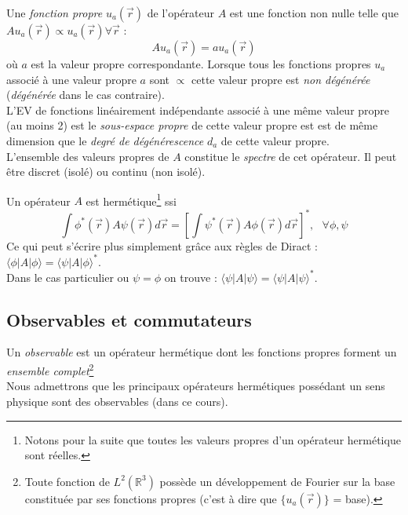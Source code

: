 \documentclass	[11pt, a4paper, openany]{book}
\begin{document}
Une \textit{fonction propre} $u_a(\vec{r})$ de l'opérateur $A$ est une fonction non nulle telle que $Au_a(\vec{r}) \propto u_a(\vec{r}) \forall \vec{r}$ :
\begin{equation}
Au_a(\vec{r}) = au_a(\vec{r})
\end{equation}
où $a$ est la valeur propre correspondante. Lorsque tous les fonctions propres $u_a$ associé à une valeur propre $a$ sont $\propto$ cette valeur propre est \textit{non dégénérée} (\textit{dégénérée} dans le cas contraire).\\
L'EV de fonctions linéairement indépendante associé à une même valeur propre (au moins 2) est le \textit{sous-espace propre} de cette valeur propre est est de même dimension que le \textit{degré de dégénérescence} $d_a$ de cette valeur propre.\\

L'ensemble des valeurs propres de $A$ constitue le \textit{spectre} de cet opérateur. Il peut être discret (isolé) ou continu (non isolé).
 
Un opérateur $A$ est  hermétique\footnote{Notons pour la suite que toutes les valeurs propres d'un opérateur hermétique sont réelles.} ssi
\begin{equation}
\int \phi^*(\vec{r})A\psi(\vec{r})d\vec{r} = \left[ \int\psi^*(\vec{r})A\phi(\vec{r})d\vec{r} \right]^*, \ \ \ \forall \phi, \psi
\end{equation}
Ce qui peut s'écrire plus simplement grâce aux règles de Diract : $\langle \phi|A|\phi \rangle = \langle\psi|A|\phi\rangle^*$.\\
Dans le cas particulier ou $\psi =  \phi$ on trouve : $\langle\psi|A|\psi\rangle = \langle\psi|A|\psi\rangle^*$.

\subsection*{Observables et commutateurs}
Un \textit{observable} est un opérateur hermétique dont les fonctions propres forment un \textit{ensemble complet}\footnote{Toute fonction de $L^2(\mathbb{R}^3)$ possède un développement de Fourier sur la base constituée par ses fonctions propres (c'est à dire que $\{u_a(\vec{r})\}$ = base).}\\
Nous admettrons que les principaux opérateurs hermétiques possédant un sens physique sont des observables (dans ce cours).\\
\end{document}
